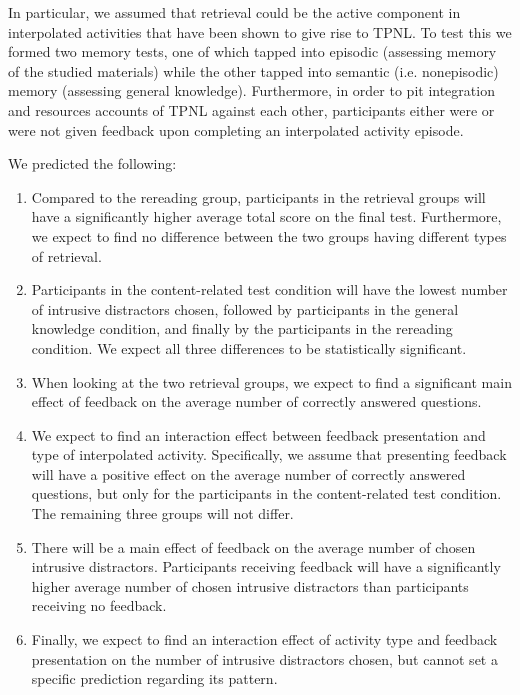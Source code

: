 \documentclass[../main.tex]{subfiles}
\begin{document}
In particular, we assumed that retrieval could be the active component in
interpolated activities that have been shown to give rise to TPNL. To test this
we formed two memory tests, one of which tapped into episodic
(assessing memory of the studied materials) while the other tapped into semantic
(i.e. nonepisodic) memory (assessing general knowledge).
Furthermore, in order to pit integration
and resources accounts of TPNL against each other, participants either were or
were not given feedback upon completing an interpolated activity episode.

We predicted the following:
\begin{enumerate}[label = H\arabic*:, ref = hypothesis \arabic*]
    \itemsep0pt
    \item\label{h1} Compared to the rereading group, participants in the retrieval groups
        will have a significantly higher average total score on the final
        test. Furthermore, we expect to find no difference between the two
        groups having different types of retrieval.
    \item\label{h2} Participants in the content-related test condition will have the
        lowest number of intrusive distractors chosen, followed by participants
        in the general knowledge condition, and finally by the participants in
        the rereading condition. We expect all three differences to be
        statistically significant.
    \item\label{h3} When looking at the two retrieval groups, we
        expect to find a significant main effect of feedback on the average
        number of correctly answered questions.
    \item\label{h4} We expect to find an interaction effect between feedback
        presentation and type of interpolated activity. Specifically, we assume
        that presenting feedback will have a positive effect on the average
        number of correctly answered questions, but only for the participants in
        the content-related test condition. The remaining three groups will not
        differ.
    \item\label{h5} There will be a main effect of feedback on the average number of
        chosen intrusive distractors. Participants receiving feedback will have
        a significantly higher average number of chosen intrusive distractors
        than participants receiving no feedback.
    \item\label{h6} Finally, we expect to find an interaction effect of activity type and
        feedback presentation on the number of intrusive distractors chosen, but
        cannot set a specific prediction regarding its pattern.
\end{enumerate}
 
\end{document}
